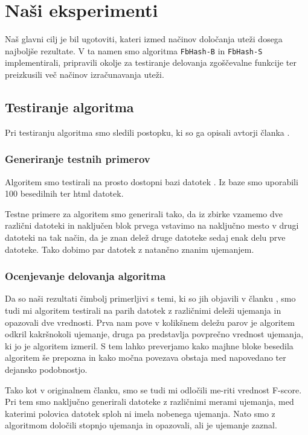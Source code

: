 \documentclass{acm_proc_article-sp}
\begin{document}
\section{Na\v{s}i eksperimenti}
Naš glavni cilj je bil ugotoviti, kateri izmed načinov določanja uteži dosega najboljše rezultate. V ta namen smo algoritma \texttt{FbHash-B} in \texttt{FbHash-S} implementirali, pripravili okolje za testiranje delovanja zgoščevalne funkcije ter preizkusili več načinov izračunavanja uteži.

\subsection{Testiranje algoritma}
Pri testiranju algoritma smo sledili postopku, ki so ga opisali avtorji članka \cite{fbhash}.

\subsubsection{Generiranje testnih primerov}
Algoritem smo testirali na prosto dostopni bazi datotek \cite{roussev2011evaluation}. Iz baze smo uporabili 100 besedilnih ter html datotek.

Testne primere za algoritem smo generirali tako, da iz zbirke vzamemo dve različni datoteki in naključen blok prvega vstavimo na naključno mesto v drugi datoteki na tak način, da je znan delež druge datoteke sedaj enak delu prve datoteke. Tako dobimo par datotek z natančno znanim ujemanjem.

\subsubsection{Ocenjevanje delovanja algoritma}
Da so naši rezultati čimbolj primerljivi s temi, ki so jih objavili v članku \cite{fbhash}, smo tudi mi algoritem testirali na parih datotek z različnimi deleži ujemanja in opazovali dve vrednosti. Prva nam pove v kolikšnem deležu parov je algoritem odkril kakršnokoli ujemanje, druga pa predstavlja povprečno vrednost ujemanja, ki jo je algoritem izmeril. S tem lahko preverjamo kako majhne bloke besedila algoritem še prepozna in kako močna povezava obstaja med napovedano ter dejansko podobnostjo.

Tako kot v originalnem članku, smo se tudi mi odločili me-riti vrednost F-score. Pri tem smo naključno generirali datoteke z različnimi merami ujemanja, med katerimi polovica datotek sploh ni imela nobenega ujemanja. Nato smo z algoritmom določili stopnjo ujemanja in opazovali, ali je ujemanje zaznal.
\end{document}
